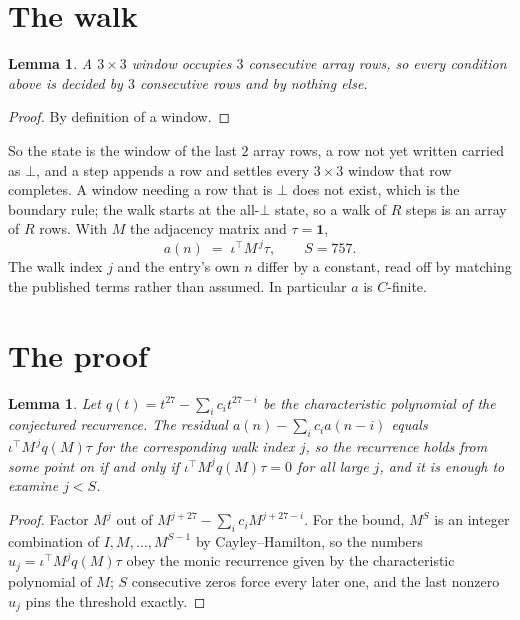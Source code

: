 \documentclass[11pt,a4paper]{article}
\theoremstyle{plain}
\newtheorem{lemma}[theorem]{Lemma}
\theoremstyle{definition}
\begin{document}
\section{The walk}

\begin{lemma}\label{lem:win}
A $3\times3$ window occupies $3$ consecutive array rows, so every condition above is
decided by $3$ consecutive rows and by nothing else.
\end{lemma}

\begin{proof}
By definition of a window.
\end{proof}

So the state is the window of the last $2$ array rows, a row not yet written carried as
$\bot$, and a step appends a row and settles every $3\times3$ window that row completes. A
window needing a row that is $\bot$ does not exist, which is the boundary rule; the walk starts
at the all-$\bot$ state, so a walk of $R$ steps is an array of $R$ rows. With $M$ the adjacency
matrix and $\tau=\mathbf{1}$,
\[
a(n)\;=\;\iota^{\!\top}M^{\,j}\tau ,\qquad S=757.
\]
The walk index $j$ and the entry's own $n$ differ by a constant, read off by matching the
published terms rather than assumed. In particular $a$ is $C$-finite.

\section{The proof}

\begin{lemma}\label{lem:crit}
Let $q(t)=t^{27}-\sum_i c_it^{27-i}$ be the characteristic polynomial of the
conjectured recurrence. The residual $a(n)-\sum_ic_ia(n-i)$ equals
$\iota^{\!\top}M^{\,j}q(M)\tau$ for the corresponding walk index $j$, so the recurrence
holds from some point on if and only if $\iota^{\!\top}M^{j}q(M)\tau=0$ for all large $j$,
and it is enough to examine $j<S$.
\end{lemma}

\begin{proof}
Factor $M^{j}$ out of $M^{j+27}-\sum_ic_iM^{j+27-i}$. For the bound, $M^{S}$
is an integer combination of $I,M,\dots,M^{S-1}$ by Cayley--Hamilton, so the numbers
$u_j=\iota^{\!\top}M^{j}q(M)\tau$ obey the monic recurrence given by the characteristic
polynomial of $M$; $S$ consecutive zeros force every later one, and the last nonzero $u_j$
pins the threshold exactly.
\end{proof}
\end{document}

